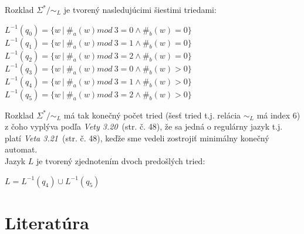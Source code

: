 \documentclass[11pt,a4paper]{article}
\begin{document}
Rozklad $\Sigma^* / \sim_L$ je tvorený nasledujúcimi šiestimi triedami:

\begin{center}
$L^{-1}(q_0) = \{w\ |\ \#_a(w) mod\ 3 = 0 \wedge \#_b(w) = 0\}$\\
$L^{-1}(q_1) = \{w\ |\ \#_a(w) mod\ 3 = 1 \wedge \#_b(w) = 0\}$\\
$L^{-1}(q_2) = \{w\ |\ \#_a(w) mod\ 3 = 2 \wedge \#_b(w) = 0\}$\\
$L^{-1}(q_3) = \{w\ |\ \#_a(w) mod\ 3 = 0 \wedge \#_b(w) > 0\}$\\
$L^{-1}(q_4) = \{w\ |\ \#_a(w) mod\ 3 = 1 \wedge \#_b(w) > 0\}$\\
$L^{-1}(q_5) = \{w\ |\ \#_a(w) mod\ 3 = 2 \wedge \#_b(w) > 0\}$\\
\end{center}

Rozklad $\Sigma^* / \sim_L$ má tak konečný počet tried (šesť tried t.j. relácia $\sim_L$ má index 6) z čoho vyplýva podľa \textit{Vety 3.20}~\cite{TIN}(str. č. 48), že sa jedná o regulárny jazyk t.j. platí \textit{Veta 3.21}~\cite{TIN}(str. č. 48), keďže sme vedeli zostrojiť minimálny konečný automat.\\

Jazyk $L$ je tvorený zjednotením dvoch predošlých tried:

\begin{center}
$L = L^{-1}(q_4) \cup L^{-1}(q_5)$\\
\end{center}

\newpage
\section{Literatúra}

\begin{flushleft}
    
\end{flushleft}
\end{document}
